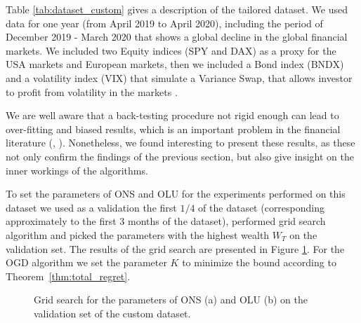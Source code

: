 Table \ref{tab:dataset_custom} gives a description of the tailored dataset. We used data for one year (from April 2019 to April 2020), including the period of December 2019 - March 2020 that shows a global decline in the global financial markets. We included two Equity indices (SPY and DAX) as a proxy for the USA markets and European markets, then we included a Bond index (BNDX) and a volatility index (VIX) that simulate a Variance Swap, that allows investor to profit from volatility in the markets \cite{bossu2006introduction}.

We are well aware that a back-testing procedure not rigid enough can lead to over-fitting and biased results, which is an important problem in the financial literature (\cite{bailey2016probability}, \cite{harvey2015backtesting}).
Nonetheless, we found interesting to present these results, as these not only confirm the findings of the previous section, but also give insight on the inner workings of the algorithms. 

To set the parameters of ONS and OLU for the experiments performed on this dataset we used as a validation the first $1/4$ of the dataset (corresponding approximately to the first $3$ months of the dataset), performed  grid search algorithm and picked the parameters with the highest wealth $W_T$ on the validation set. The results of the grid search are presented in Figure \ref{fig:grid}. For the OGD algorithm we set the parameter $K$ to minimize the bound according to Theorem~\ref{thm:total_regret}.

\begin{figure}[ht!]
    \centering
\caption{Grid search for the parameters of ONS (a) and OLU (b) on the validation set of the custom dataset.} \label{fig:grid}
\end{figure}

